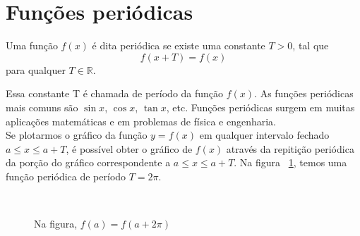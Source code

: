 
\section{Funções periódicas}

\begin{definicao}
\label{def1}
    
Uma função $f(x)$ é dita periódica se existe uma constante $T > 0$, tal que 
\begin{equation}
    f(x + T) = f(x)
\end{equation}
para qualquer $T \in \mathbb{R}$. 
\end{definicao}
Essa constante T é chamada de período da função $f(x)$. As funções periódicas 
mais comuns são $\sin{x}$, $\cos{x}$, $\tan{x}$, etc. Funções periódicas surgem
em muitas aplicações matemáticas e em problemas de física e engenharia. 
\\
Se plotarmos o gráfico da função $y=f(x)$ em qualquer intervalo fechado 
\mbox{$a \leq x \leq a + T$}, é possível obter o gráfico de $f(x)$ através da 
repitição periódica da porção do gráfico correspondente a \mbox{$a \leq x \leq a + T$}.
Na figura ~\ref{fig:periodExp}, temos uma função periódica de período $T=2\pi$.
\\
\begin{figure}[H]
     \\
    \caption{Na figura, $f(a) = f(a + 2\pi)$}
    \label{fig:periodExp}
\end{figure}

